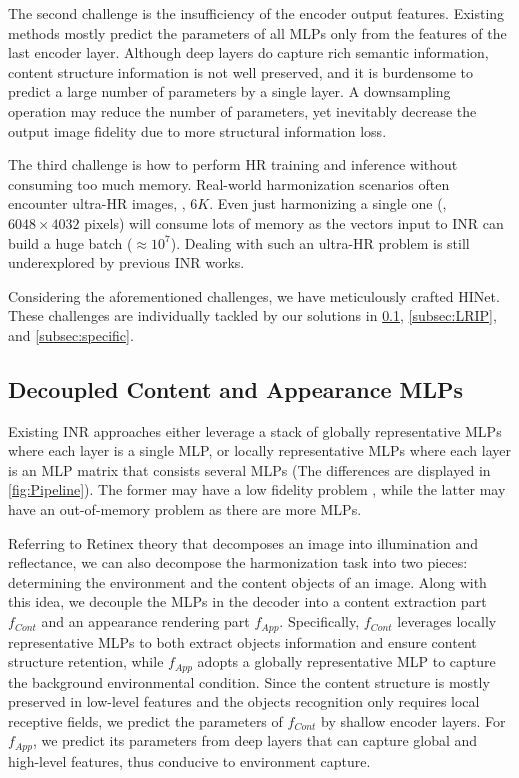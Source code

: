 \documentclass[10pt,journal,twocolumn,twoside]{IEEEtran}
\begin{document}
The second challenge is the insufficiency of the encoder output features. Existing methods mostly predict the parameters of all MLPs only from the features of the last encoder layer. Although deep layers do capture rich semantic information, content structure information is not well preserved, and it is burdensome to predict a large number of parameters by a single layer. A downsampling operation may reduce the number of parameters, yet inevitably decrease the output image fidelity due to more structural information loss.

The third challenge is how to perform HR training and inference without consuming too much memory. Real-world harmonization scenarios often encounter ultra-HR images, \eg, $6K$. Even just harmonizing a single one (\eg, $6048 \times 4032$ pixels) will consume lots of memory as the vectors input to INR can build a huge batch ($\approx10^7$). Dealing with such an ultra-HR problem is still underexplored by previous INR works.

Considering the aforementioned challenges, we have meticulously crafted HINet. These challenges are individually tackled by our solutions in \cref{subsec:decoupled}, \cref{subsec:LRIP}, and \cref{subsec:specific}.


\subsection{Decoupled Content and Appearance MLPs}
\label{subsec:decoupled}

Existing INR approaches either leverage a stack of globally representative MLPs \cite{skorokhodov2021adversarial, anokhin2021image} where each layer is a single MLP, or locally representative MLPs \cite{shaham2021spatially} where each layer is an MLP matrix that consists several MLPs (The differences are displayed in \cref{fig:Pipeline}). The former may have a low fidelity problem \cite{sitzmann2020implicit}, while the latter may have an out-of-memory problem as there are more MLPs.

Referring to Retinex theory \cite{land1971lightness, land1977retinex} that decomposes an image into illumination and reflectance, we can also decompose the harmonization task into two pieces: determining the environment and the content objects of an image. Along with this idea, we decouple the MLPs in the decoder into a content extraction part $f_{Cont}$ and an appearance rendering part $f_{App}$. Specifically, $f_{Cont}$ leverages locally representative MLPs to both extract objects information and ensure content structure retention, while $f_{App}$ adopts a globally representative MLP to capture the background environmental condition. Since the content structure is mostly preserved in low-level features and the objects recognition only requires local receptive fields, we predict the parameters of $f_{Cont}$ by shallow encoder layers. For $f_{App}$, we predict its parameters from deep layers that can capture global and high-level features, thus conducive to environment capture.
\end{document}

